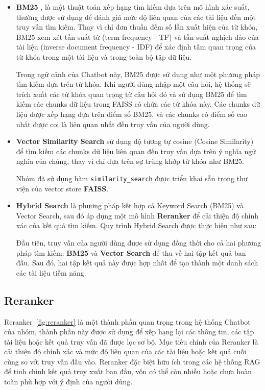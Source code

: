 \documentclass{article}
\numberwithin{equation}{section}
\numberwithin{equation}{section}
\begin{document}
\begin{itemize}
    \item \textbf{BM25} \cite{NguyenVanA2021BM25Viblo}, \cite{Robertson2009BM25Foundations} là một thuật toán xếp hạng tìm kiếm dựa trên mô hình xác suất, thường được sử dụng để đánh giá mức độ liên quan của các tài liệu đến một truy vấn tìm kiếm. Thay vì chỉ đơn thuần đếm số lần xuất hiện của từ khóa, BM25 xem xét tần suất từ (term frequency - TF) và tần suất nghịch đảo của tài liệu (inverse document frequency - IDF) để xác định tầm quan trọng của từ khóa trong một tài liệu và trong toàn bộ tập dữ liệu.
    
    Trong ngữ cảnh của Chatbot này, BM25 được sử dụng như một phương pháp tìm kiếm dựa trên từ khóa. Khi người dùng nhập một câu hỏi, hệ thống sẽ trích xuất các từ khóa quan trọng từ câu hỏi đó và sử dụng BM25 để tìm kiếm các chunks dữ liệu trong FAISS có chứa các từ khóa này. Các chunks dữ liệu được xếp hạng dựa trên điểm số BM25, và các chunks có điểm số cao nhất được coi là liên quan nhất đến truy vấn của người dùng.

    \item \textbf{Vector Similarity Search} sử dụng độ tương tự cosine (Cosine Similarity) để tìm kiếm các chunks dữ liệu liên quan đến truy vấn dựa trên ý nghĩa ngữ nghĩa của chúng, thay vì chỉ dựa trên sự trùng khớp từ khóa như BM25.
    
    Nhóm đã sử dụng hàm \texttt{similarity\_search} được triển khai sẵn trong thư viện của vector store \textbf{FAISS}.

    \item \textbf{Hybrid Search}\cite{NguyenHuuPhuoc2023SearchEngineVDB2} là phương pháp kết hợp cả Keyword Search (BM25) và Vector Search, sau đó áp dụng một mô hình \textbf{Reranker} để cải thiện độ chính xác của kết quả tìm kiếm. Quy trình Hybrid Search được thực hiện như sau:
    
    Đầu tiên, truy vấn của người dùng được sử dụng đồng thời cho cả hai phương pháp tìm kiếm: \textbf{BM25} và \textbf{Vector Search} để thu về hai tập kết quả ban đầu. Sau đó, hai tập kết quả này được hợp nhất để tạo thành một danh sách các tài liệu tiềm năng.
\end{itemize}

\subsection{Reranker}
Reranker~\ref{fig:reranker} là một thành phần quan trọng trong hệ thống Chatbot của nhóm, thành phần này được sử dụng để xếp hạng lại các thông tin, các tập tài liệu hoặc kết quả truy vấn đã được lọc sơ bộ. Mục tiêu chính của Reranker là cải thiện độ chính xác và mức độ liên quan của các tài liệu hoặc kết quả cuối cùng so với truy vấn đầu vào. Reranker đặc biệt hữu ích trong các hệ thống RAG để tinh chỉnh kết quả truy xuất ban đầu, vốn có thể còn nhiễu hoặc chưa hoàn toàn phù hợp với ý định của người dùng.
\end{document}
